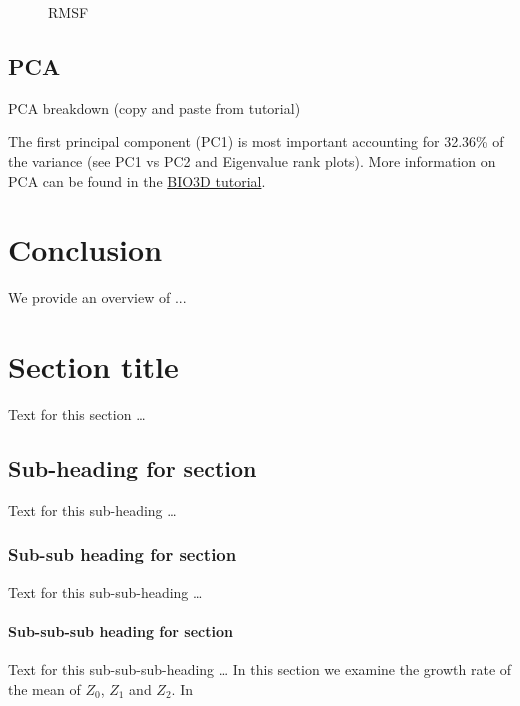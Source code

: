 \documentclass[twocolumn]{bmcart}%
\def\texttt{[image: ]}
\begin{document}
\begin{figure}[h!]
  \caption{
      RMSF}
\label{fig:rmsf}
      \end{figure}

\subsection*{PCA}
PCA breakdown (copy and paste from tutorial)

The first principal component (PC1) is most important accounting for
32.36\% of the variance (see PC1 vs PC2 and Eigenvalue rank plots). More
information on PCA can be found in the
\href{http://thegrantlab.org/bio3d/tutorials/trajectory-analysis}{BIO3D
tutorial}.


\hypertarget{conclusion}{%
\section*{Conclusion}\label{conclusion}}

We provide an overview of ... 



\section*{Section title}
Text for this section \ldots
\subsection*{Sub-heading for section}
Text for this sub-heading \ldots
\subsubsection*{Sub-sub heading for section}
Text for this sub-sub-heading \ldots
\paragraph*{Sub-sub-sub heading for section}
Text for this sub-sub-sub-heading \ldots
In this section we examine the growth rate of the mean of $Z_0$, $Z_1$ and $Z_2$. In


\end{document}
